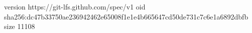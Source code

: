 version https://git-lfs.github.com/spec/v1
oid sha256:dc47b33750ae236942462e65008f1e1e4b665647cd50de731c7c6e1a6892dbfb
size 11108
